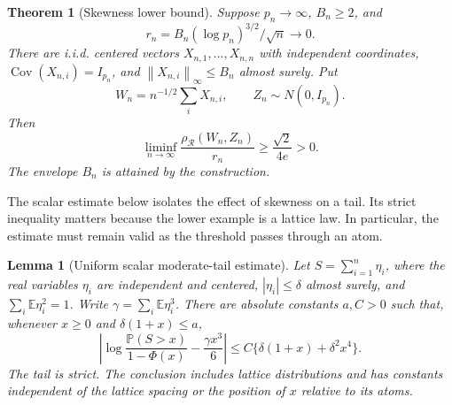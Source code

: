 \documentclass[11pt,a4paper]{article}
\newtheorem{theorem}{Theorem}
\newtheorem{lemma}{Lemma}
\theoremstyle{remark}
\newcommand{\E}{\mathbb E}
\newcommand{\Pp}{\mathbb P}
\newcommand{\Cov}{\operatorname{Cov}}
\newcommand{\norm}[1]{\left\lVert#1\right\rVert}
\newcommand{\rh}{\rho_{\mathcal R}}
\begin{document}
\begin{theorem}[Skewness lower bound]
\label{opt:skew-lower}
Suppose \(p_n\to\infty\), \(B_n\ge2\), and
\[r_n=B_n(\log p_n)^{3/2}/\sqrt n\longrightarrow0.\]
There are i.i.d. centered vectors \(X_{n,1},\ldots,X_{n,n}\) with
independent coordinates, \(\Cov(X_{n,i})=I_{p_n}\), and
\(\norm{X_{n,i}}_\infty\le B_n\) almost surely. Put
\[W_n=n^{-1/2}\sum_iX_{n,i},\qquad Z_n\sim N(0,I_{p_n}).\]
Then
\begin{equation}
 \liminf_{n\to\infty}\frac{\rh(W_n,Z_n)}{r_n}
 \ge\frac{\sqrt2}{4e}>0.
 \label{opt:lower-constant}
\end{equation}
The envelope \(B_n\) is attained by the construction.
\end{theorem}

The scalar estimate below isolates the effect of skewness on a tail.
Its strict inequality matters because the lower example is a lattice
law. In particular, the estimate must remain valid as the threshold
passes through an atom.

\begin{lemma}[Uniform scalar moderate-tail estimate]
\label{opt:moderate-tail}
Let \(S=\sum_{i=1}^n\eta_i\), where the real variables \(\eta_i\) are
independent and centered, \(|\eta_i|\le\delta\) almost surely, and
\(\sum_i\E\eta_i^2=1\). Write
\(\gamma=\sum_i\E\eta_i^3\). There are absolute constants \(a,C>0\)
such that, whenever \(x\ge0\) and \(\delta(1+x)\le a\),
\begin{equation}
 \left|\log\frac{\Pp(S>x)}{1-\Phi(x)}
       -\frac{\gamma x^3}{6}\right|
 \le C\{\delta(1+x)+\delta^2x^4\}.
 \label{opt:moderate-tail-formula}
\end{equation}
The tail is strict. The conclusion includes lattice distributions and
has constants independent of the lattice spacing or the position of
\(x\) relative to its atoms.
\end{lemma}
\end{document}

